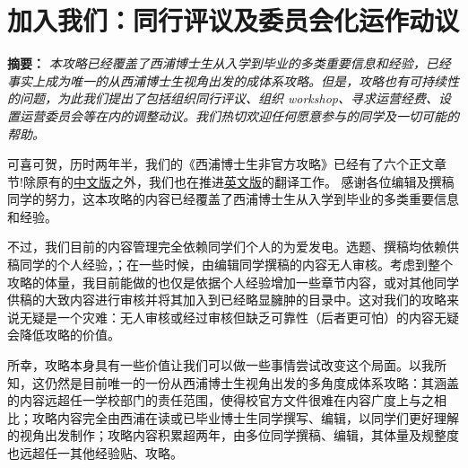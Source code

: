 \section{加入我们：同行评议及委员会化运作动议}
\textbf{摘要：} \textit{本攻略已经覆盖了西浦博士生从入学到毕业的多类重要信息和经验，已经事实上成为唯一的从西浦博士生视角出发的成体系攻略。但是，攻略也有可持续性的问题，为此我们提出了包括组织同行评议、组织 workshop、寻求运营经费、设置运营委员会等在内的调整动议。我们热切欢迎任何愿意参与的同学及一切可能的帮助。}

可喜可贺，历时两年半，我们的《西浦博士生非官方攻略》已经有了六个正文章节!除原有的\href{https://github.com/xp-pgrs-unofficial-guide/xp_pgrs_unofficial_guide/releases}{中文版}之外，我们也在推进\href{https://github.com/xp-pgrs-unofficial-guide/xp_pgrs_unofficial_guide_EN/releases}{英文版}的翻译工作。
感谢各位编辑及撰稿同学的努力，这本攻略的内容已经覆盖了西浦博士生从入学到毕业的多类重要信息和经验。

不过，我们目前的内容管理完全依赖同学们个人的为爱发电。选题、撰稿均依赖供稿同学的个人经验，；在一些时候，由编辑同学撰稿的内容无人审核。考虑到整个攻略的体量，我目前能做的也仅是依据个人经验增加一些章节内容，或对其他同学供稿的大致内容进行审核并将其加入到已经略显臃肿的目录中。这对我们的攻略来说无疑是一个灾难：无人审核或经过审核但缺乏可靠性（后者更可怕）的内容无疑会降低攻略的价值。

所幸，攻略本身具有一些价值让我们可以做一些事情尝试改变这个局面。以我所知，这仍然是目前唯一的一份从西浦博士生视角出发的多角度成体系攻略：其涵盖的内容远超任一学校部门的责任范围，使得校官方文件很难在内容广度上与之相比；攻略内容完全由西浦在读或已毕业博士生同学撰写、编辑，以同学们更好理解的视角出发制作；攻略内容积累超两年，由多位同学撰稿、编辑，其体量及规整度也远超任一其他经验贴、攻略。

\vspace{5mm}


